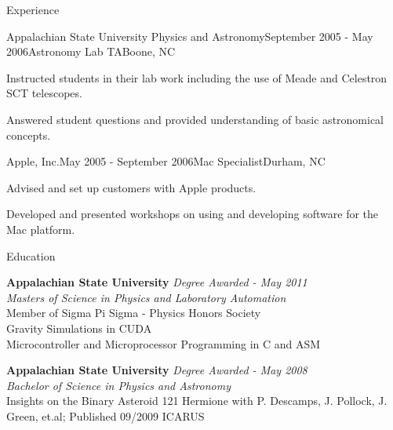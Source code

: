 \documentclass{cv} %
\begin{document}
\begin{rSection}{Experience}
\begin{rSubsection}{Appalachian State University Physics and Astronomy}{September 2005 - May 2006}{Astronomy Lab TA}{Boone, NC}
\item Instructed students in their lab work including the use of Meade and Celestron SCT telescopes.
\item Answered student questions and provided understanding of basic astronomical concepts.
\end{rSubsection}

\begin{rSubsection}{Apple, Inc.}{May 2005 - September 2006}{Mac Specialist}{Durham, NC}
\item Advised and set up customers with Apple products.
\item Developed and presented workshops on using and developing software for the Mac platform.
\end{rSubsection}

\end{rSection}


\begin{rSection}{Education}
	
	{\bf Appalachian State University} \hfill {\em Degree Awarded - May 2011} \\ 
	{\em Masters of Science in Physics and Laboratory Automation} \\
	Member of Sigma Pi Sigma - Physics Honors Society \\
	Gravity Simulations in CUDA \\
	Microcontroller and Microprocessor Programming in C and ASM
	
	{\bf Appalachian State University} \hfill {\em Degree Awarded - May 2008} \\ 
	{\em Bachelor of Science in Physics and Astronomy} \\
	{Insights on the Binary Asteroid 121 Hermione with P. Descamps, J. Pollock, J. Green, et.al; \linebreak Published 09/2009 ICARUS}
	
	
\end{rSection}

\end{document}
